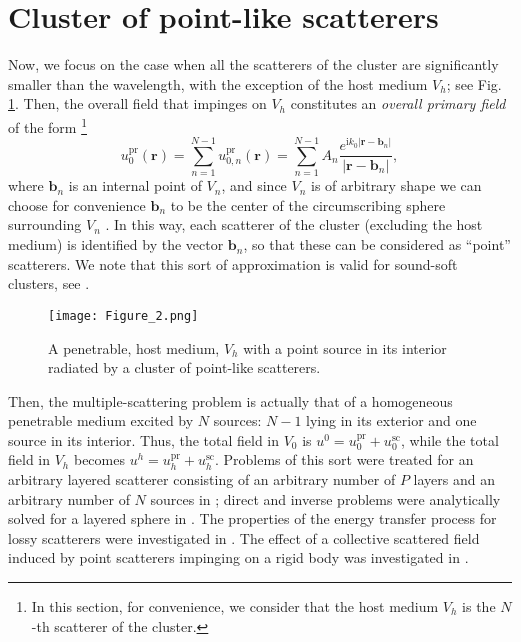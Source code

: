 \documentclass{article}
\begin{document}
\section{Cluster of point-like scatterers}

Now, we focus on the case when all the scatterers of the cluster are significantly smaller than the wavelength, with the exception of the host medium $V_h$; see Fig. \ref{fig:mult2}. Then, the overall field that impinges on $V_h$ constitutes an \emph{overall primary field} of the form \footnote{In this section, for convenience, we consider that the host medium $V_h$ is the $N$-th scatterer of the cluster.}
%
\begin{equation}
    \label{point-like_1}
    u_0^{\mathrm{pr}}(\mathbf{r})=\sum_{n=1}^{N-1}u_{0,n}^{\mathrm{pr}}(\mathbf{r})=\sum_{n=1}^{N-1}A_n\frac{e^{\mathrm{i}k_0\lvert\mathbf{r}-\mathbf{b}_n\rvert}}{\lvert\mathbf{r}-\mathbf{b}_n\rvert},
\end{equation}
%
where $\mathbf{b}_n$ is an internal point of $V_n$, and since $V_n$ is of arbitrary shape we can choose for convenience $\mathbf{b}_n$ to be the center of the circumscribing sphere surrounding $V_n$ \cite{Martin}. In this way, each scatterer of the cluster (excluding the host medium) is identified by the vector $\mathbf{b}_n$, so that these can be considered as ``point'' scatterers. We note that this sort of approximation is valid for sound-soft clusters, see \cite{Martin_MS, WM, JCOMP}.
%
\begin{figure}[!htb]
\centering
\texttt{[image: Figure\_2.png]}
\caption{A penetrable, host medium, $V_{h}$ with a point source in its interior radiated by a cluster of point-like scatterers.}
\label{fig:mult2}
\end{figure}
%
Then, the multiple-scattering problem is actually that of a homogeneous penetrable medium excited by $N$ sources: $N-1$ lying in its exterior and one source in its interior. Thus, the total field in $V_0$ is $u^0=u_0^{\mathrm{pr}}+u_0^{\mathrm{sc}}$, while the total field in $V_h$ becomes $u^h=u_h^{\mathrm{pr}}+u_h^{\mathrm{sc}}$. Problems of this sort were treated for an arbitrary layered scatterer consisting of an arbitrary number of $P$ layers and an arbitrary number of $N$ sources in \cite{QAM1}; direct and inverse problems were analytically solved for a layered sphere in \cite{QAM2}. The properties of the energy transfer process for lossy scatterers were investigated in \cite{PRSA}. The effect of a collective scattered field induced by point scatterers impinging on a rigid body was investigated in \cite{MMS}. 
\end{document}

